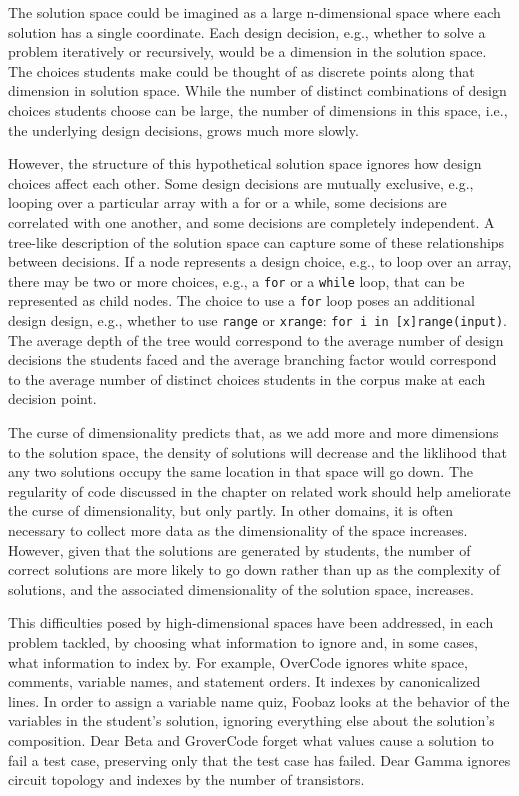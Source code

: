 The solution space could be imagined as a large n-dimensional space where each solution has a single coordinate. Each design decision, e.g., whether to solve a problem iteratively or recursively, would be a dimension in the solution space. The choices students make could be thought of as discrete points along that dimension in solution space. While the number of distinct combinations of design choices students choose can be large, the number of dimensions in this space, i.e., the underlying design decisions, grows much more slowly. 

However, the structure of this hypothetical solution space ignores how design choices affect each other. Some design decisions are mutually exclusive, e.g., looping over a particular array with a for or a while, some decisions are correlated with one another, and some decisions are completely independent. A tree-like description of the solution space can capture some of these relationships between decisions. If a node represents a design choice, e.g., to loop over an array, there may be two or more choices, e.g., a \texttt{for} or a \texttt{while} loop, that can be represented as child nodes. The choice to use a \texttt{for} loop poses an additional design design, e.g., whether to use \texttt{range} or \texttt{xrange}: \texttt{for i in [x]range(input)}. The average depth of the tree would correspond to the average number of design decisions the students faced and the average branching factor would correspond to the average number of distinct choices students in the corpus make at each decision point.

The curse of dimensionality predicts that, as we add more and more dimensions to the solution space, the density of solutions will decrease and the liklihood that any two solutions occupy the same location in that space will go down. The regularity of code discussed in the chapter on related work should help ameliorate the curse of dimensionality, but only partly. In other domains, it is often necessary to collect more data as the dimensionality of the space increases. However, given that the solutions are generated by students, the number of correct solutions are more likely to go down rather than up as the complexity of solutions, and the associated dimensionality of the solution space, increases.

This difficulties posed by high-dimensional spaces have been addressed, in each problem tackled, by choosing what information to ignore and, in some cases, what information to index by. For example, OverCode ignores white space, comments, variable names, and statement orders. It indexes by canonicalized lines. In order to assign a variable name quiz, Foobaz looks at the behavior of the variables in the student's solution, ignoring everything else about the solution's composition. Dear Beta and GroverCode forget what values cause a solution to fail a test case, preserving only that the test case has failed. Dear Gamma ignores circuit topology and indexes by the number of transistors.

